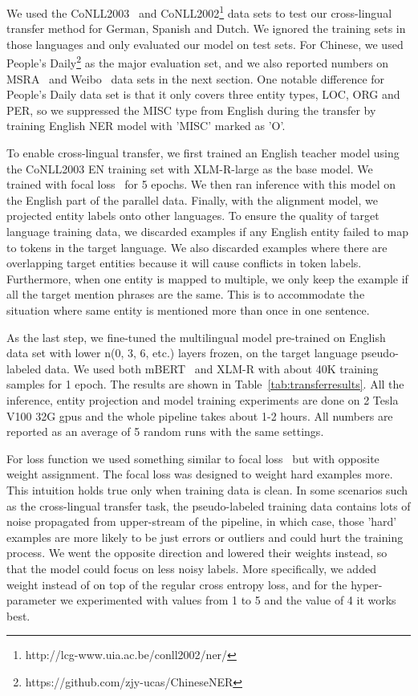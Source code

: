 \documentclass[11pt]{article}
\begin{document}
We used the CoNLL2003~\cite{conll2003ner} and CoNLL2002\footnote{http://lcg-www.uia.ac.be/conll2002/ner/} data sets to test our cross-lingual transfer method for German, Spanish and Dutch. We ignored the training sets in those languages and only evaluated our model on test sets. For Chinese, we used People's Daily\footnote{https://github.com/zjy-ucas/ChineseNER} as the major evaluation set, and we also reported numbers on MSRA~\cite{levow-2006-third} and Weibo~\cite{peng-dredze-2015-named} data sets in the next section. One notable difference for People's Daily data set is that it only covers three entity types, LOC, ORG and PER, so we suppressed the MISC type from English during the transfer by training English NER model with 'MISC' marked as 'O'.

To enable cross-lingual transfer, we first trained an English teacher model using the CoNLL2003 EN training set with XLM-R-large as the base model. We trained with focal loss~\cite{focal} for 5 epochs. We then ran inference with this model on the English part of the parallel data. Finally, with the alignment model, we projected entity labels onto other languages. To ensure the quality of target language training data, we discarded examples if any English entity failed to map to tokens in the target language. We also discarded examples where there are overlapping target entities because it will cause conflicts in token labels. Furthermore, when one entity is mapped to multiple, we only keep the example if all the target mention phrases are the same. This is to accommodate the situation where same entity is mentioned more than once in one sentence.

As the last step, we fine-tuned the multilingual model pre-trained on English data set with lower n(0, 3, 6, etc.) layers frozen, on the target language pseudo-labeled data. We used both mBERT~\cite{devlin-etal-2019-bert, multilingualBERTmd} and XLM-R\cite{Conneau2020} with about 40K training samples for 1 epoch. The results are shown in Table~\ref{tab:transferresults}. All the inference, entity projection and model training experiments are done on 2 Tesla V100 32G gpus and the whole pipeline takes about 1-2 hours. All numbers are reported as an average of 5 random runs with the same settings.

For loss function we used something similar to focal loss~\cite{focal} but with opposite weight assignment. The focal loss was designed to weight hard examples more. This intuition holds true only when training data is clean. In some scenarios such as the cross-lingual transfer task, the pseudo-labeled training data contains lots of noise propagated from upper-stream of the pipeline, in which case, those 'hard' examples are more likely to be just errors or outliers and could hurt the training process. We went the opposite direction and lowered their weights instead, so that the model could focus on less noisy labels. More specifically, we added weight  instead of  on top of the regular cross entropy loss, and for the hyper-parameter  we experimented with values from 1 to 5 and the value of 4 it works best.
\end{document}
